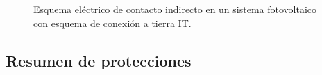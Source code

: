 %
\begin{figure}
\hfill{}\hfill{}\hfill{}

\caption{Esquema eléctrico de contacto indirecto en un sistema fotovoltaico
con esquema de conexión a tierra IT.\label{fig:ContactoIndirectoIT}}

\end{figure}



\subsection{Resumen de protecciones}

